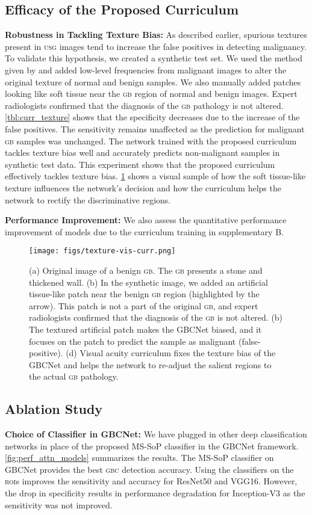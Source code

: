 \documentclass[10pt,twocolumn,letterpaper]{article}
\def\usg{\textsc{usg}\xspace}
\def\gbc{\textsc{gbc}\xspace}
\def\gb{\textsc{gb}\xspace}
\def\rois{\textsc{roi}s\xspace}
\newcommand{\myfirstpara}[1]{\noindent \textbf{#1:}}
\newcommand{\mypara}[1]{\vspace{0.1em} \myfirstpara{#1}}
\begin{document}
\subsection{Efficacy of the Proposed Curriculum}
\myfirstpara{Robustness in Tackling Texture Bias}
As described earlier, spurious textures present in \usg images tend to increase the false positives in detecting malignancy. To validate this hypothesis, we created a synthetic test set. We used the method given by \cite{yang2020fda} and added low-level frequencies from malignant images to alter the original texture of normal and benign samples. We also manually added patches looking like soft tissue near the \gb region of normal and benign images. Expert radiologists confirmed that the diagnosis of the \gb pathology is not altered. \cref{tbl:curr_texture} shows that the specificity decreases due to the increase of the false positives. The sensitivity remains unaffected as the prediction for malignant \gb samples was unchanged. The network trained with the proposed curriculum tackles texture bias well and accurately predicts non-malignant samples in synthetic test data. This experiment shows that the proposed curriculum effectively tackles texture bias. \cref{fig:texture_vis} shows a visual sample of how the soft tissue-like texture influences the network's decision and how the curriculum helps the network to rectify the discriminative regions. 

\mypara{Performance Improvement} 
We also assess the quantitative performance improvement of models due to the curriculum training in supplementary B. 

\begin{figure}[t]
	\centering
	\texttt{[image: figs/texture-vis-curr.png]}
	\caption{(a) Original image of a benign \gb. The \gb presents a stone and thickened wall. (b) In the synthetic image, we added an artificial tissue-like patch near the benign \gb region (highlighted by the arrow). This patch is not a part of the original \gb, and expert radiologists confirmed that the diagnosis of the \gb is not altered. (b) The textured artificial patch makes the GBCNet biased, and it focuses on the patch to predict the sample as malignant (false-positive). (d) Visual acuity curriculum fixes the texture bias of the GBCNet and helps the network to re-adjust the salient regions to the actual \gb pathology. }
	\label{fig:texture_vis}
\end{figure}



\subsection{Ablation Study}
\myfirstpara{Choice of Classifier in GBCNet}
We have plugged in other deep classification networks in place of the proposed MS-SoP classifier in the GBCNet framework. \cref{fig:perf_attn_models} summarizes the results. The MS-SoP classifier on GBCNet provides the best \gbc detection accuracy. Using the classifiers on the \rois improves the sensitivity and accuracy for ResNet50 and VGG16. However, the drop in specificity results in performance degradation for Inception-V3 as the sensitivity was not improved.  
\end{document}
